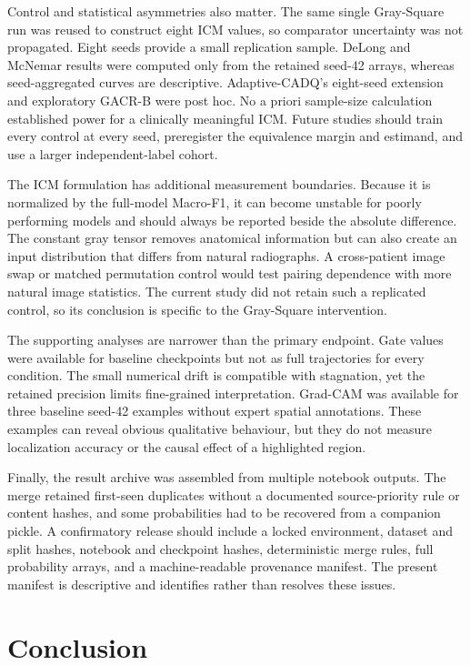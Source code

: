 \documentclass[10pt,a4paper,twocolumn]{article}
\begin{document}
Control and statistical asymmetries also matter. The same single Gray-Square
run was reused to construct eight ICM values, so comparator uncertainty was not
propagated. Eight seeds provide a small replication sample. DeLong and McNemar
results were computed only from the retained seed-42 arrays, whereas
seed-aggregated curves are descriptive. Adaptive-CADQ's eight-seed extension and
exploratory GACR-B were post hoc. No a priori sample-size calculation established power for
a clinically meaningful ICM. Future studies should train every control at every
seed, preregister the equivalence margin and estimand, and use a larger
independent-label cohort.

The ICM formulation has additional measurement boundaries. Because it is
normalized by the full-model Macro-F1, it can become unstable for poorly
performing models and should always be reported beside the absolute difference.
The constant gray tensor removes anatomical information but can also create an
input distribution that differs from natural radiographs. A cross-patient image
swap or matched permutation control would test pairing dependence with more
natural image statistics. The current study did not retain such a replicated
control, so its conclusion is specific to the Gray-Square intervention.

The supporting analyses are narrower than the primary endpoint. Gate values
were available for baseline checkpoints but not as full trajectories for every
condition. The small numerical drift is compatible with stagnation, yet the
retained precision limits fine-grained interpretation. Grad-CAM was available
for three baseline seed-42 examples without expert spatial annotations. These
examples can reveal obvious qualitative behaviour, but they do not measure
localization accuracy or the causal effect of a highlighted region.

Finally, the result archive was assembled from multiple notebook outputs. The
merge retained first-seen duplicates without a documented source-priority rule
or content hashes, and some probabilities had to be recovered from a companion
pickle. A confirmatory release should include a locked environment, dataset and
split hashes, notebook and checkpoint hashes, deterministic merge rules, full
probability arrays, and a machine-readable provenance manifest. The present
manifest is descriptive and identifies rather than resolves these issues.

\section{Conclusion}\label{sec:conclusion}
\end{document}
